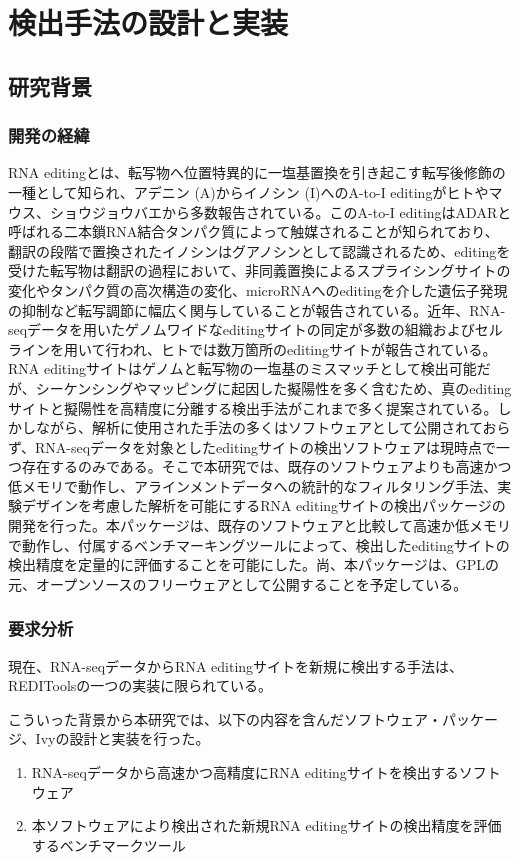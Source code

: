 \chapter{検出手法の設計と実装}
\section{研究背景}
\subsection{開発の経緯}
RNA editingとは、転写物へ位置特異的に一塩基置換を引き起こす転写後修飾の一種として知られ、アデニン (A)からイノシン (I)へのA-to-I editingがヒトやマウス、ショウジョウバエから多数報告されている。このA-to-I editingはADARと呼ばれる二本鎖RNA結合タンパク質によって触媒されることが知られており、翻訳の段階で置換されたイノシンはグアノシンとして認識されるため、editingを受けた転写物は翻訳の過程において、非同義置換によるスプライシングサイトの変化やタンパク質の高次構造の変化、microRNAへのeditingを介した遺伝子発現の抑制など転写調節に幅広く関与していることが報告されている。近年、RNA-seqデータを用いたゲノムワイドなeditingサイトの同定が多数の組織およびセルラインを用いて行われ、ヒトでは数万箇所のeditingサイトが報告されている。RNA editingサイトはゲノムと転写物の一塩基のミスマッチとして検出可能だが、シーケンシングやマッピングに起因した擬陽性を多く含むため、真のeditingサイトと擬陽性を高精度に分離する検出手法がこれまで多く提案されている。しかしながら、解析に使用された手法の多くはソフトウェアとして公開されておらず、RNA-seqデータを対象としたeditingサイトの検出ソフトウェアは現時点で一つ存在するのみである。そこで本研究では、既存のソフトウェアよりも高速かつ低メモリで動作し、アラインメントデータへの統計的なフィルタリング手法、実験デザインを考慮した解析を可能にするRNA editingサイトの検出パッケージの開発を行った。本パッケージは、既存のソフトウェアと比較して高速か低メモリで動作し、付属するベンチマーキングツールによって、検出したeditingサイトの検出精度を定量的に評価することを可能にした。尚、本パッケージは、GPLの元、オープンソースのフリーウェアとして公開することを予定している。

\subsection{要求分析}
現在、RNA-seqデータからRNA editingサイトを新規に検出する手法は、REDIToolsの一つの実装に限られている。
\par
こういった背景から本研究では、以下の内容を含んだソフトウェア・パッケージ、Ivyの設計と実装を行った。
\begin{enumerate}
	\renewcommand{\labelenumi}{(\roman{enumi})}
	\item RNA-seqデータから高速かつ高精度にRNA editingサイトを検出するソフトウェア
	\item 本ソフトウェアにより検出された新規RNA editingサイトの検出精度を評価するベンチマークツール
\end{enumerate}

